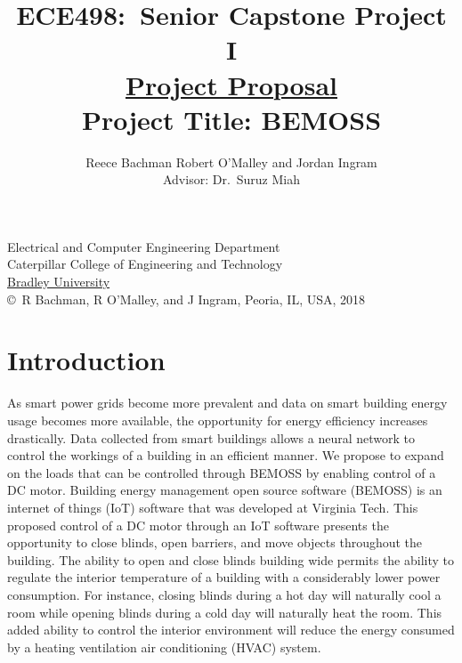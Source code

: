 \documentclass[letterpaper,12pt]{article}   %
\title{ECE498:~Senior Capstone Project I\\\textbf{\underline{Project Proposal}}\\
\vspace{0.5in}
Project Title: BEMOSS}
\author{Reece Bachman Robert O'Malley and Jordan Ingram\\ Advisor: Dr.~Suruz Miah
}
\date{}  %
\begin{document}
\begin{titlepage}
 \maketitle

\vspace*{4.0cm}
\begin{center}
\normalsize
Electrical and Computer Engineering Department\\
Caterpillar College of Engineering and Technology\\
\href{http://www.bradley.edu/}{Bradley University}\\

\vspace*{6.0cm}
\copyright~R Bachman, R O'Malley, and J Ingram, Peoria, IL, USA, 2018\\

\end{center}
\thispagestyle{empty}

\end{titlepage} 
\newpage
\renewcommand{\contentsname}{Table of Contents}
\tableofcontents
\newpage

\section{Introduction} %

As smart power grids become more prevalent and data on smart building energy usage becomes more available, the opportunity for energy efficiency increases drastically. Data collected from smart buildings allows a neural network to control the workings of a building in an efficient manner. We propose to expand on the loads that can be controlled through BEMOSS by enabling control of a DC motor. Building energy management open source software (BEMOSS) is an internet of things (IoT) software that was developed at Virginia Tech. This proposed control of a DC motor through an IoT software presents the opportunity to close blinds, open barriers, and move objects throughout the building. The ability to open and close blinds building wide permits the ability to regulate the interior temperature of a building with a considerably lower power consumption. For instance, closing blinds during a hot day will naturally cool a room while opening blinds during a cold day will naturally heat the room. This added ability to control the interior environment will reduce the energy consumed by a heating ventilation air conditioning (HVAC) system. 
\end{document}
